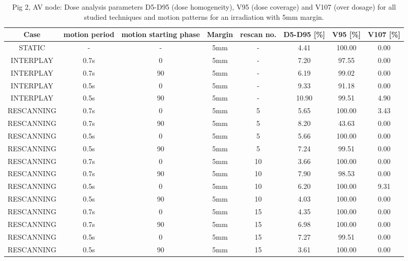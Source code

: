 \documentclass[type=dr, dr=rernat, accentcolor=tud7b,colorbacktitle, bigchapter, openright, twoside, 12pt ]{tudthesis}
\begin{document}
\begin{table}[H]
  \centering
\tiny
  \caption{Pig 2, AV node: Dose analysis parameters D5-D95 (dose homogeneity), V95 (dose coverage) and V107 (over dosage) for all studied 
  techniques and motion patterns for an irradiation with 5mm margin.}
  \begin{tabular}{|c||c|c|c|c||c|c|c|}
    \hline\hline
    Case & motion period & motion starting phase & Margin & rescan no. & D5-D95 [\%] & V95 [\%] & V107 [\%] \\
    \hline \hline
STATIC & - & - & 5mm & - & 4.41 & 100.00 & 0.00\\
\hline \hline
INTERPLAY & 0.7s & 0 & 5mm & - & 7.20 & 97.55 & 0.00\\
INTERPLAY & 0.7s & 90 & 5mm & - & 6.19 & 99.02 & 0.00\\
INTERPLAY & 0.5s & 0 & 5mm & - & 9.33 & 91.18 & 0.00\\
INTERPLAY & 0.5s & 90 & 5mm & - & 10.90 & 99.51 & 4.90\\
\hline \hline
RESCANNING & 0.7s & 0 & 5mm & 5 & 5.65 & 100.00 & 3.43\\
RESCANNING & 0.7s & 90 & 5mm & 5 & 8.20 & 43.63 & 0.00\\
RESCANNING & 0.5s & 0 & 5mm & 5 & 5.66 & 100.00 & 0.00\\
RESCANNING & 0.5s & 90 & 5mm & 5 & 7.24 & 99.51 & 0.00\\
\hline
RESCANNING & 0.7s & 0 & 5mm & 10 & 3.66 & 100.00 & 0.00\\
RESCANNING & 0.7s & 90 & 5mm & 10 & 7.90 & 98.53 & 0.00\\
RESCANNING & 0.5s & 0 & 5mm & 10 & 6.20 & 100.00 & 9.31\\
RESCANNING & 0.5s & 90 & 5mm & 10 & 4.03 & 100.00 & 0.00\\
\hline
RESCANNING & 0.7s & 0 & 5mm & 15 & 4.35 & 100.00 & 0.00\\
RESCANNING & 0.7s & 90 & 5mm & 15 & 6.98 & 100.00 & 0.00\\
RESCANNING & 0.5s & 0 & 5mm & 15 & 7.27 & 99.51 & 0.00\\
RESCANNING & 0.5s & 90 & 5mm & 15 & 3.61 & 100.00 & 0.00\\
    \hline\hline 
  \end{tabular}
  \label{tab:Pig2_AV}
\end{table}

\newpage
\end{document}
